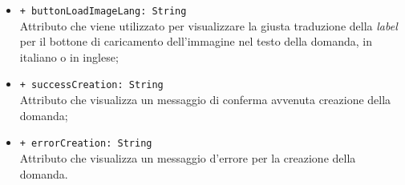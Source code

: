 \begin{itemize}
\begin{itemize}
		\item \texttt{+ buttonLoadImageLang: String} \\ Attributo che viene utilizzato per visualizzare la giusta traduzione della \textit{label} per il bottone di caricamento dell'immagine nel testo della domanda, in italiano o in inglese;
		\item \texttt{+ successCreation: String} \\ Attributo che visualizza un messaggio di conferma avvenuta creazione della domanda;
		\item \texttt{+ errorCreation: String} \\ Attributo che visualizza un messaggio d'errore per la creazione della domanda.
	\end{itemize}
\end{itemize}


